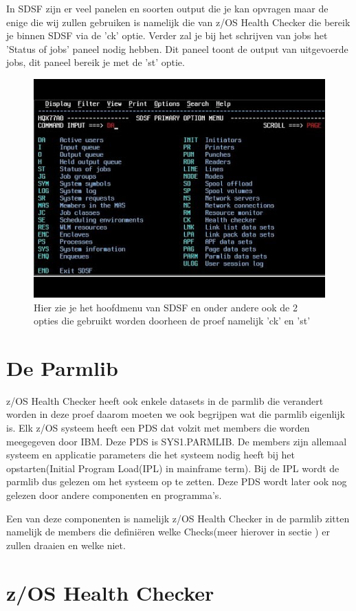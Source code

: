 In SDSF zijn er veel panelen en soorten output die je kan opvragen maar de enige die wij zullen gebruiken is namelijk die van z/OS Health Checker die bereik je binnen SDSF via de 'ck' optie. Verder zal je bij het schrijven van jobs het 'Status of jobs' paneel nodig hebben. Dit paneel toont de output van uitgevoerde jobs, dit paneel bereik je met de 'st' optie.

\begin{figure}[h]
	\centering
	\includegraphics[width=0.7\linewidth]{img/SDSF}
	\caption[SDSF Hoofdmenu]{Hier zie je het hoofdmenu van SDSF en onder andere ook de 2 opties die gebruikt worden doorheen de proef namelijk 'ck' en 'st'}
	\label{fig:sdsf}
\end{figure}

 
\section{De Parmlib}
\label{sec:De Parmlib}

z/OS Health Checker heeft ook enkele datasets in de parmlib die verandert worden in deze proef daarom moeten we ook begrijpen wat die parmlib eigenlijk is. Elk z/OS systeem heeft een PDS dat volzit met members die worden meegegeven door IBM. Deze PDS is SYS1.PARMLIB. De members zijn allemaal systeem en applicatie parameters die het systeem nodig heeft bij het opstarten(Initial Program Load(IPL) in mainframe term). Bij de IPL wordt de parmlib dus gelezen om het systeem op te zetten. Deze PDS wordt later ook nog gelezen door andere componenten en programma's. \cite{Cosimo2018}
 
Een van deze componenten is namelijk z/OS Health Checker in de parmlib zitten namelijk de members die definiëren welke Checks(meer hierover in sectie ) er zullen draaien en welke niet.
 
\section{z/OS Health Checker}
\label{sec:z/OS Health Checker}

